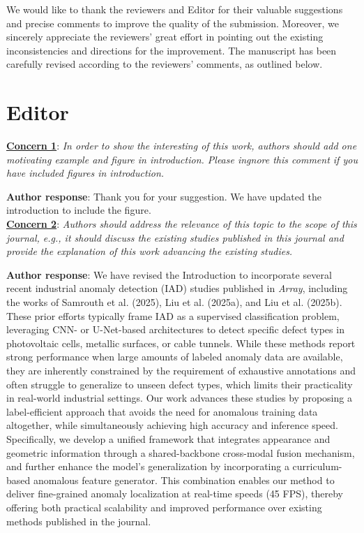 \documentclass[a4paper,fleqnn]{cas-sc}
\begin{document}

We would like to thank the reviewers and Editor for their valuable suggestions and precise comments to improve the quality of the submission. Moreover, we sincerely appreciate the reviewers' great effort in pointing out the existing inconsistencies and directions for the improvement. The manuscript has been carefully revised according to the reviewers' comments, as outlined below. \\

\section{\textbf{Editor}}

\noindent \textbf{\underline{Concern 1}}: \textit{In order to show the interesting of this work, authors should add one motivating example and figure in introduction. Please ingnore this comment if you have included figures in introduction. \\}

\noindent \textbf{Author response}: Thank you for your suggestion. We have updated the introduction to include the figure. \\ 

\noindent \textbf{\underline{Concern 2}}: \textit{Authors should address the relevance of this topic to the scope of this journal, e.g., it should discuss the existing studies published in this journal and provide the explanation of this work advancing the existing studies. \\}

\noindent \textbf{Author response}: We have revised the Introduction to incorporate several recent industrial anomaly detection (IAD) studies published in \textit{Array}, including the works of Samrouth et al. (2025), Liu et al. (2025a), and Liu et al. (2025b). These prior efforts typically frame IAD as a supervised classification problem, leveraging CNN- or U-Net-based architectures to detect specific defect types in photovoltaic cells, metallic surfaces, or cable tunnels. While these methods report strong performance when large amounts of labeled anomaly data are available, they are inherently constrained by the requirement of exhaustive annotations and often struggle to generalize to unseen defect types, which limits their practicality in real-world industrial settings. Our work advances these studies by proposing a label-efficient approach that avoids the need for anomalous training data altogether, while simultaneously achieving high accuracy and inference speed. Specifically, we develop a unified framework that integrates appearance and geometric information through a shared-backbone cross-modal fusion mechanism, and further enhance the model's generalization by incorporating a curriculum-based anomalous feature generator. This combination enables our method to deliver fine-grained anomaly localization at real-time speeds (45 FPS), thereby offering both practical scalability and improved performance over existing methods published in the journal. \\
\end{document}
